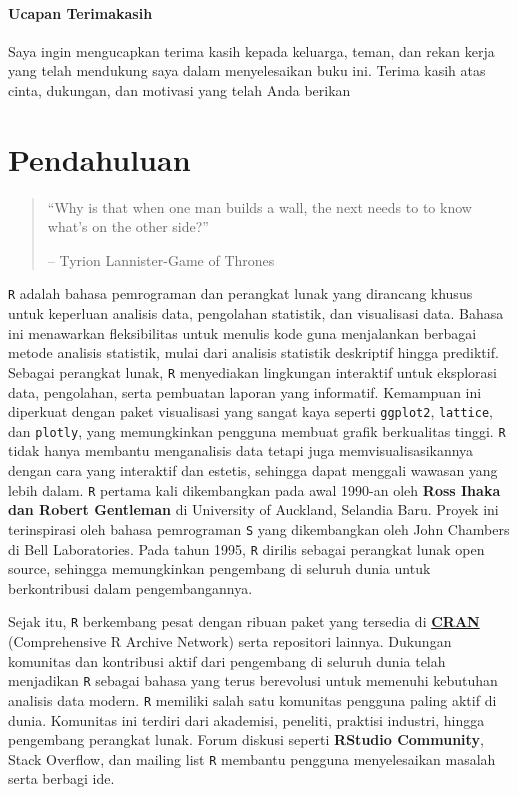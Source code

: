 \documentclass[
  oneside]{book}
\begin{document}
\subsubsection*{Ucapan Terimakasih}\label{ucapan-terimakasih}

Saya ingin mengucapkan terima kasih kepada keluarga, teman, dan rekan kerja yang telah mendukung saya dalam menyelesaikan buku ini. Terima kasih atas cinta, dukungan, dan motivasi yang telah Anda berikan

\chapter{Pendahuluan}\label{pd}

\begin{quote}
``Why is that when one man builds a wall, the next needs to to know
what's on the other side?''

-- Tyrion Lannister-Game of Thrones
\end{quote}

\texttt{R} adalah bahasa pemrograman dan perangkat lunak yang
dirancang khusus untuk keperluan analisis data, pengolahan statistik,
dan visualisasi data. Bahasa ini menawarkan fleksibilitas untuk menulis
kode guna menjalankan berbagai metode analisis statistik, mulai dari
analisis statistik deskriptif hingga prediktif. Sebagai perangkat lunak,
\texttt{R} menyediakan lingkungan interaktif untuk eksplorasi data,
pengolahan, serta pembuatan laporan yang informatif. Kemampuan ini
diperkuat dengan paket visualisasi yang sangat kaya seperti \texttt{ggplot2},
\texttt{lattice}, dan \texttt{plotly}, yang memungkinkan pengguna membuat grafik
berkualitas tinggi. \texttt{R} tidak hanya membantu menganalisis
data tetapi juga memvisualisasikannya dengan cara yang interaktif dan
estetis, sehingga dapat menggali wawasan yang lebih dalam.
\texttt{R} pertama kali dikembangkan pada awal 1990-an oleh \textbf{Ross
Ihaka dan Robert Gentleman} di University of Auckland, Selandia Baru.
Proyek ini terinspirasi oleh bahasa pemrograman \texttt{S} yang
dikembangkan oleh John Chambers di Bell Laboratories. Pada tahun 1995,
\texttt{R} dirilis sebagai perangkat lunak open source, sehingga
memungkinkan pengembang di seluruh dunia untuk berkontribusi dalam
pengembangannya.

Sejak itu, \texttt{R} berkembang pesat dengan ribuan paket yang
tersedia di \href{https://cran.r-project.org/}{\textbf{CRAN}} (Comprehensive R
Archive Network) serta repositori lainnya. Dukungan komunitas dan
kontribusi aktif dari pengembang di seluruh dunia telah menjadikan
\texttt{R} sebagai bahasa yang terus berevolusi untuk memenuhi
kebutuhan analisis data modern. \texttt{R} memiliki salah satu
komunitas pengguna paling aktif di dunia. Komunitas ini terdiri dari
akademisi, peneliti, praktisi industri, hingga pengembang perangkat
lunak. Forum diskusi seperti \textbf{RStudio Community}, Stack Overflow, dan
mailing list \texttt{R} membantu pengguna menyelesaikan masalah
serta berbagi ide.
\end{document}
